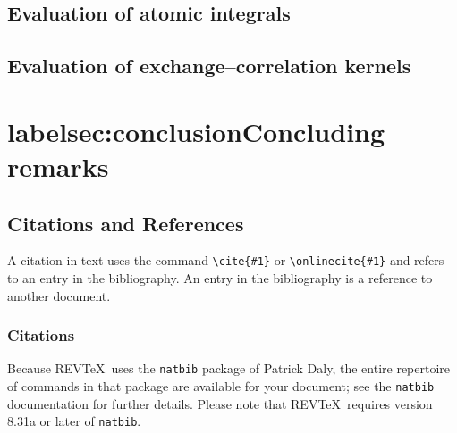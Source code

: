 \documentclass[%
 reprint,
 amsmath,amssymb,
 aps,
]{revtex4-1}
\begin{document}
\subsection{\label{sec:integrals}Evaluation of atomic integrals}

\subsection{\label{sec:XCkernels}Evaluation of exchange--correlation kernels}

\section{label{sec:conclusion}Concluding remarks}


\subsection{\label{sec:citeref}Citations and References}
A citation in text uses the command \verb+\cite{#1}+ or
\verb+\onlinecite{#1}+ and refers to an entry in the bibliography. 
An entry in the bibliography is a reference to another document.

\subsubsection{Citations}
Because REV\TeX\ uses the \verb+natbib+ package of Patrick Daly, 
the entire repertoire of commands in that package are available for your document;
see the \verb+natbib+ documentation for further details. Please note that
REV\TeX\ requires version 8.31a or later of \verb+natbib+.
\end{document}

